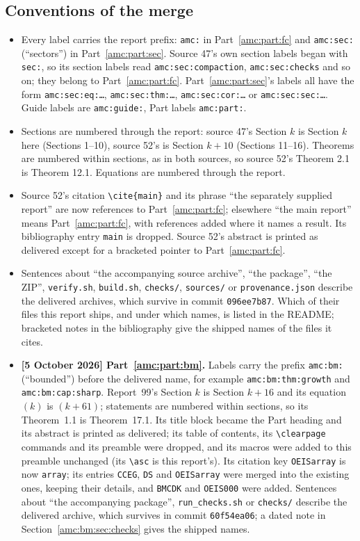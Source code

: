 \documentclass[11pt,letterpaper]{article}
\theoremstyle{remark}\newtheorem{remark}[theorem]{Remark}
\begin{document}
\subsection*{Conventions of the merge}
\label{amc:guide:conventions}
\begin{itemize}
\item Every label carries the report prefix: \texttt{amc:} in Part~\ref{amc:part:fc} and \texttt{amc:sec:} (``sectors'') in Part~\ref{amc:part:sec}. Source 47's own section labels began with \texttt{sec:}, so its section labels read \texttt{amc:sec:compaction}, \texttt{amc:sec:checks} and so on; they belong to Part~\ref{amc:part:fc}. Part~\ref{amc:part:sec}'s labels all have the form \texttt{amc:sec:eq:\ldots}, \texttt{amc:sec:thm:\ldots}, \texttt{amc:sec:cor:\ldots} or \texttt{amc:sec:sec:\ldots}. Guide labels are \texttt{amc:guide:}, Part labels \texttt{amc:part:}.
\item Sections are numbered through the report: source 47's Section $k$ is Section $k$ here (Sections 1--10), source 52's is Section $k+10$ (Sections 11--16). Theorems are numbered within sections, as in both sources, so source 52's Theorem 2.1 is Theorem 12.1. Equations are numbered through the report.
\item Source 52's citation \texttt{\textbackslash cite\{main\}} and its phrase ``the separately supplied report'' are now references to Part~\ref{amc:part:fc}; elsewhere ``the main report'' means Part~\ref{amc:part:fc}, with references added where it names a result. Its bibliography entry \texttt{main} is dropped. Source 52's abstract is printed as delivered except for a bracketed pointer to Part~\ref{amc:part:fc}.
\item Sentences about ``the accompanying source archive'', ``the package'', ``the ZIP'', \texttt{verify.sh}, \texttt{build.sh}, \texttt{checks/}, \texttt{sources/} or \texttt{provenance.json} describe the delivered archives, which survive in commit \texttt{096ee7b87}. Which of their files this report ships, and under which names, is listed in the README; bracketed notes in the bibliography give the shipped names of the files it cites.
\item \textbf{[5 October 2026] Part~\ref{amc:part:bm}.} Labels carry the prefix \texttt{amc:bm:} (``bounded'') before the delivered name, for example \texttt{amc:bm:thm:growth} and \texttt{amc:bm:cap:sharp}. Report~99's Section $k$ is Section $k+16$ and its equation $(k)$ is $(k+61)$; statements are numbered within sections, so its Theorem~1.1 is Theorem~17.1. Its title block became the Part heading and its abstract is printed as delivered; its table of contents, its \texttt{\textbackslash clearpage} commands and its preamble were dropped, and its macros were added to this preamble unchanged (its \texttt{\textbackslash asc} is this report's). Its citation key \texttt{OEISarray} is now \texttt{array}; its entries \texttt{CCEG}, \texttt{DS} and \texttt{OEISarray} were merged into the existing ones, keeping their details, and \texttt{BMCDK} and \texttt{OEIS000} were added. Sentences about ``the accompanying package'', \texttt{run\_checks.sh} or \texttt{checks/} describe the delivered archive, which survives in commit \texttt{60f54ea06}; a dated note in Section~\ref{amc:bm:sec:checks} gives the shipped names.

\end{itemize}
\end{document}
